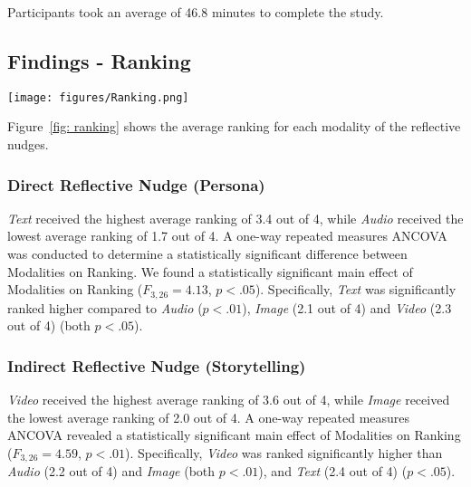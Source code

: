 Participants took an average of 46.8 minutes to complete the study.

\subsection{Findings - Ranking}
\begin{figure*}[!htbp]
  \centering
  \texttt{[image: figures/Ranking.png]}
  \caption{Mean ranking for the four modalities for the direct reflective nudge (left) and indirect reflective nudge (right) with 1 being the lowest rank and 4 being the highest rank. We report the results of the ANCOVA test and pairwise comparisons with BH correction, where * : p < .05, ** : p < .01.}
  \label{fig: ranking}
\end{figure*}

Figure~\ref{fig: ranking} shows the average ranking for each modality of the reflective nudges. 

\subsubsection{Direct Reflective Nudge (Persona)}
\emph{Text} received the highest average ranking of 3.4 out of 4, while \emph{Audio} received the lowest average ranking of 1.7 out of 4. A one-way repeated measures ANCOVA was conducted to determine a statistically significant difference between Modalities on Ranking. We found a statistically significant main effect of Modalities on Ranking ($F_{3,26} = 4.13$, $p<.05$). Specifically, \emph{Text} was significantly ranked higher compared to \emph{Audio} ($p<.01$), \emph{Image} (2.1 out of 4) and \emph{Video} (2.3 out of 4) (both $p<.05$).

\subsubsection{Indirect Reflective Nudge (Storytelling)} 
\emph{Video} received the highest average ranking of 3.6 out of 4, while \emph{Image} received the lowest average ranking of 2.0 out of 4. A one-way repeated measures ANCOVA revealed a statistically significant main effect of Modalities on Ranking ($F_{3,26} = 4.59$, $p<.01$). Specifically, \emph{Video} was ranked significantly higher than \emph{Audio} (2.2 out of 4) and \emph{Image} (both $p<.01$), and \emph{Text} (2.4 out of 4) ($p<.05$).

